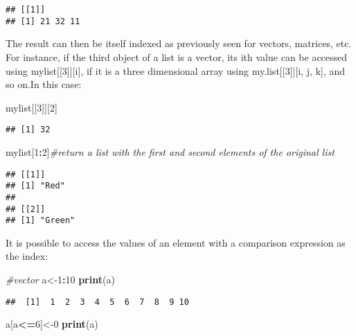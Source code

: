 \documentclass[]{book}
\newenvironment{Shaded}{\begin{snugshade}}{\end{snugshade}}
\newcommand{\KeywordTok}[1]{\textcolor[rgb]{0.13,0.29,0.53}{\textbf{#1}}}
\newcommand{\DecValTok}[1]{\textcolor[rgb]{0.00,0.00,0.81}{#1}}
\newcommand{\CommentTok}[1]{\textcolor[rgb]{0.56,0.35,0.01}{\textit{#1}}}
\newcommand{\OperatorTok}[1]{\textcolor[rgb]{0.81,0.36,0.00}{\textbf{#1}}}
\newcommand{\NormalTok}[1]{#1}
\theoremstyle{definition}
\theoremstyle{definition}
\theoremstyle{definition}
\theoremstyle{remark}
\begin{document}
\begin{verbatim}
## [[1]]
## [1] 21 32 11
\end{verbatim}

The result can then be itself indexed as previously seen for vectors,
matrices, etc. For instance, if the third object of a list is a vector,
its ith value can be accessed using mylist{[}{[}3{]}{]}{[}i{]}, if it is
a three dimensional array using my.list{[}{[}3{]}{]}{[}i, j, k{]}, and
so on.In this case:

\begin{Shaded}
\begin{Highlighting}[]
\NormalTok{mylist[[}\DecValTok{3}\NormalTok{]][}\DecValTok{2}\NormalTok{]}
\end{Highlighting}
\end{Shaded}

\begin{verbatim}
## [1] 32
\end{verbatim}

\begin{Shaded}
\begin{Highlighting}[]
\NormalTok{mylist[}\DecValTok{1}\OperatorTok{:}\DecValTok{2}\NormalTok{]}\CommentTok{#return a list with the first and second elements of the original list}
\end{Highlighting}
\end{Shaded}

\begin{verbatim}
## [[1]]
## [1] "Red"
## 
## [[2]]
## [1] "Green"
\end{verbatim}

It is possible to access the values of an element with a comparison
expression as the index:

\begin{Shaded}
\begin{Highlighting}[]
\CommentTok{#vector}
\NormalTok{a<-}\DecValTok{1}\OperatorTok{:}\DecValTok{10}
\KeywordTok{print}\NormalTok{(a)}
\end{Highlighting}
\end{Shaded}

\begin{verbatim}
##  [1]  1  2  3  4  5  6  7  8  9 10
\end{verbatim}

\begin{Shaded}
\begin{Highlighting}[]
\NormalTok{a[a}\OperatorTok{<=}\DecValTok{6}\NormalTok{]<-}\DecValTok{0}
\KeywordTok{print}\NormalTok{(a)}
\end{Highlighting}
\end{Shaded}
\end{document}

